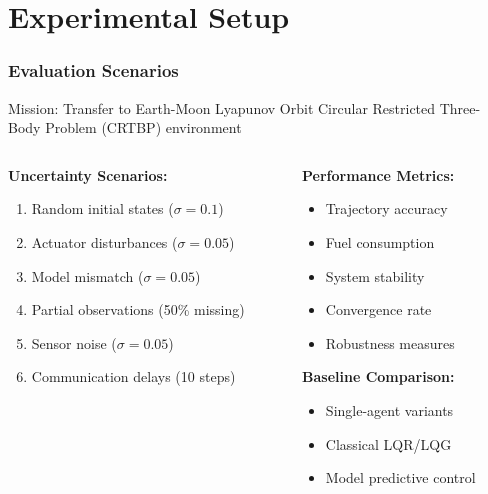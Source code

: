 \documentclass[
    11pt, %
    aspectratio=169, %
]{beamer}
\begin{document}
\section{Experimental Setup}

\begin{frame}
	\frametitle{Evaluation Scenarios}
	
	\begin{block}{Mission: Transfer to Earth-Moon Lyapunov Orbit}
		Circular Restricted Three-Body Problem (CRTBP) environment
	\end{block}
	
	\begin{columns}[t]
		\begin{column}{0.5\textwidth}
			\textbf{Uncertainty Scenarios:}
			\begin{enumerate}
				\item Random initial states ($\sigma = 0.1$)
				\item Actuator disturbances ($\sigma = 0.05$)
				\item Model mismatch ($\sigma = 0.05$)
				\item Partial observations (50\% missing)
				\item Sensor noise ($\sigma = 0.05$)
				\item Communication delays (10 steps)
			\end{enumerate}
		\end{column}
		\begin{column}{0.5\textwidth}
			\textbf{Performance Metrics:}
			\begin{itemize}
				\item Trajectory accuracy
				\item Fuel consumption
				\item System stability
				\item Convergence rate
				\item Robustness measures
			\end{itemize}
			
			\vspace{0.3cm}
			\textbf{Baseline Comparison:}
			\begin{itemize}
				\item Single-agent variants
				\item Classical LQR/LQG
				\item Model predictive control
			\end{itemize}
		\end{column}
	\end{columns}
\end{frame}
\end{document}
